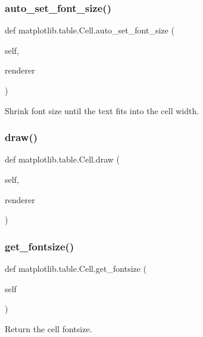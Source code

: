 \subsubsection{\texorpdfstring{auto\+\_\+set\+\_\+font\+\_\+size()}{auto\_set\_font\_size()}}
{\footnotesize\ttfamily def matplotlib.\+table.\+Cell.\+auto\+\_\+set\+\_\+font\+\_\+size (\begin{DoxyParamCaption}\item[{}]{self,  }\item[{}]{renderer }\end{DoxyParamCaption})}

\begin{DoxyVerb}Shrink font size until the text fits into the cell width.\end{DoxyVerb}
 \mbox{\label{classmatplotlib_1_1table_1_1Cell_a34e488f53ea685d01dc75e676413d5fa}} 
\subsubsection{\texorpdfstring{draw()}{draw()}}
{\footnotesize\ttfamily def matplotlib.\+table.\+Cell.\+draw (\begin{DoxyParamCaption}\item[{}]{self,  }\item[{}]{renderer }\end{DoxyParamCaption})}

\mbox{\label{classmatplotlib_1_1table_1_1Cell_a1b35fc9accca816bc39f13c8afcab5a9}} 
\subsubsection{\texorpdfstring{get\+\_\+fontsize()}{get\_fontsize()}}
{\footnotesize\ttfamily def matplotlib.\+table.\+Cell.\+get\+\_\+fontsize (\begin{DoxyParamCaption}\item[{}]{self }\end{DoxyParamCaption})}

\begin{DoxyVerb}Return the cell fontsize.\end{DoxyVerb}
 \mbox{\label{classmatplotlib_1_1table_1_1Cell_a3d9f743009484c9556727f5ba72bb4c4}} 

